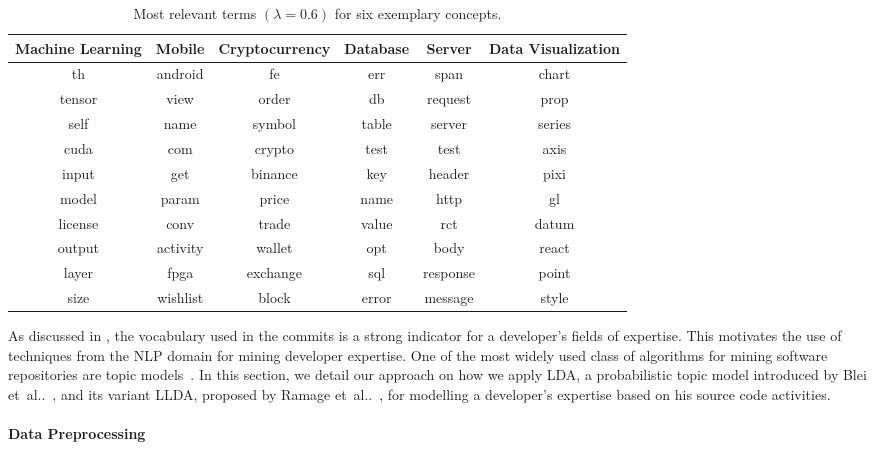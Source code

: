 \documentclass[a4paper,twoside]{article}
\makeatletter
\DeclareRobustCommand\onedot{\futurelet\@let@token\@onedot}
\def\@onedot{\ifx\@let@token.\else.\null\fi\xspace}
\def\etal{et~al\onedot\xspace}
\makeatother
\begin{document}
\begin{table}[t]
    \centering
    \caption{Most relevant terms $(\lambda = 0.6)$ for six exemplary concepts.}
    \label{tab:topics_LLDA}    
    \footnotesize    
	\setlength{\tabcolsep}{10.0pt}%
	\renewcommand{\arraystretch}{1.30}
    \begin{tabular}{c|c|c|c|c|c}
    \toprule
    \textbf{Machine Learning} & \textbf{Mobile} &
    \textbf{Cryptocurrency} & \textbf{Database} & \textbf{Server} & \textbf{Data Visualization}\\ \midrule
         th & android & fe & err & span & chart \\
         tensor & view & order & db & request & prop \\
         self & name & symbol & table & server & series \\
         cuda & com & crypto & test & test & axis \\
         input & get & binance & key & header & pixi \\
         model & param & price & name & http & gl \\
         license & conv & trade & value & rct & datum \\
         output & activity & wallet & opt & body & react \\
         layer & fpga & exchange & sql & response & point \\
         size & wishlist & block & error & message & style \\
         \hline
    \end{tabular}

\end{table}

\noindent As discussed in , the vocabulary used in the commits is a strong indicator for a developer's fields of expertise.
This motivates the use of techniques from the \ac{NLP} domain for mining developer expertise.
One of the most widely used class of algorithms for mining software repositories are topic models~\cite{chen2016survey}.
In this section, we detail our approach on how we apply \ac{LDA}, a probabilistic topic model introduced by Blei \etal~\cite{blei2003latent}, and its variant \ac{LLDA}, proposed by Ramage \etal~\cite{ramage2009labeled}, for modelling a developer's expertise based on his source code activities.

\paragraph{Data Preprocessing}
\label{KM:SubSec:DataPreprocessing}
\end{document}
